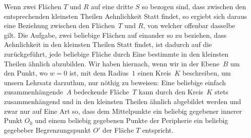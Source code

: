 \documentclass[a4paper,12pt]{article}
\begin{document}
Wenn zwei Fl\"{a}chen $T$ und $R$ auf eine dritte $S$ so bezogen
sind, dass zwischen den entsprechenden kleinsten Theilen
Aehnlichkeit Statt findet, so ergiebt sich daraus eine Beziehung
zwischen den Fl\"{a}chen~$T$ und $R$, von welcher offenbar
dasselbe gilt.  Die Aufgabe, zwei beliebige Fl\"{a}chen auf
einander so zu beziehen, dass Aehnlichkeit in den kleinsten
Theilen Statt findet, ist dadurch auf die zur\"{u}ckgef\"{u}hrt,
jede beliebige Fl\"{a}che durch Eine bestimmte in den kleinsten
Theilen \"{a}hnlich abzubilden.  Wir haben hiernach, wenn wir in
der Ebene~$B$ um den Punkt, wo $w = 0$ ist, mit dem Radius~$1$
einen Kreis~$K$ beschreiben, um unsern Lehrsatz darzuthun, nur
n\"{o}thig zu beweisen: Eine beliebige einfach
zusammenh\"{a}ngende~$A$ bedeckende Fl\"{a}che~$T$ kann durch den
Kreis~$K$ stets zusammenh\"{a}ngend und in den kleinsten Theilen
\"{a}hnlich abgebildet werden und zwar nur auf Eine Art so, dass
dem Mittelpunkte ein beliebig gegebener innerer Punkt $O_0$ und
einem beliebig gegebenen Punkte der Peripherie ein beliebig
gegebeber Begrenzungspunkt $O'$ der Fl\"{a}che $T$ entspricht.
\end{document}
